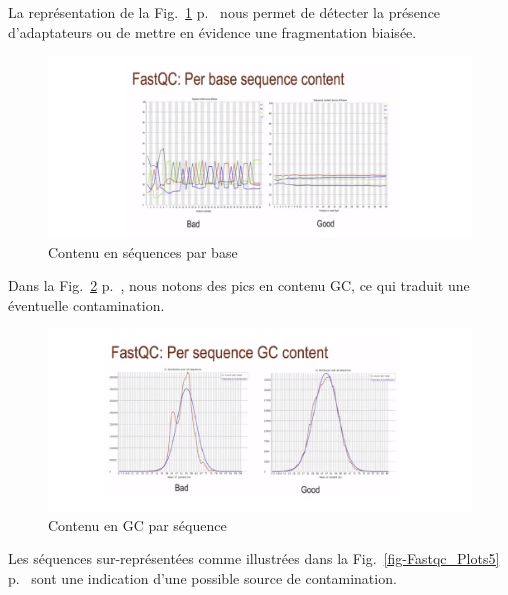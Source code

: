 \documentclass[a4paper,11pt]{article}
\begin{document}
La représentation de la Fig.~\ref{fig-Fastqc_Plots3}
p.~\pageref{fig-Fastqc_Plots3} nous permet de détecter la présence
d'adaptateurs ou de mettre en évidence une fragmentation biaisée.

\begin{figure}
  \begin{center}
    \includegraphics[width=16cm]{Images/Fastqc_Plots3}
  \end{center}
  \caption{Contenu en séquences par base}
  \label{fig-Fastqc_Plots3}
\end{figure}

Dans la Fig.~\ref{fig-Fastqc_Plots4} p.~\pageref{fig-Fastqc_Plots4},
nous notons des pics en contenu GC, ce qui traduit une éventuelle
contamination.

\begin{figure}
  \begin{center}
    \includegraphics[width=16cm]{Images/Fastqc_Plots4}
  \end{center}
  \caption{Contenu en GC par séquence}
  \label{fig-Fastqc_Plots4}
\end{figure}

Les séquences sur-représentées comme illustrées dans la
Fig.~\ref{fig-Fastqc_Plots5} p.~\pageref{fig-Fastqc_Plots5} sont une
indication d'une possible source de contamination.
\end{document}
